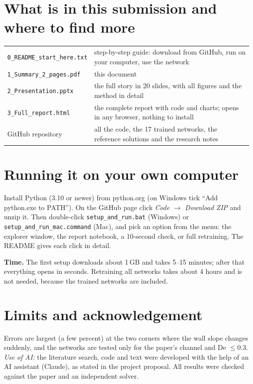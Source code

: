 \documentclass[10.5pt,a4paper]{article}
\newcommand{\code}[1]{\texttt{#1}}
\begin{document}
\section{What is in this submission and where to find more}
\begin{tabularx}{\linewidth}{@{}lX@{}}
\code{0\_README\_start\_here.txt} & step-by-step guide: download from GitHub, run on your computer, use the network\\
\code{1\_Summary\_2\_pages.pdf} & this document\\
\code{2\_Presentation.pptx} & the full story in 20 slides, with all figures and the method in detail\\
\code{3\_Full\_report.html} & the complete report with code and charts; opens in any browser, nothing to install\\
GitHub repository & all the code, the 17 trained networks, the reference solutions and the research notes\\
\end{tabularx}

\section{Running it on your own computer}
Install Python (3.10 or newer) from python.org (on Windows tick ``Add python.exe to PATH''). On the GitHub page click \emph{Code $\rightarrow$ Download ZIP} and unzip it. Then double-click \code{setup\_and\_run.bat} (Windows) or \code{setup\_and\_run\_mac.command} (Mac), and pick an option from the menu: the explorer window, the report notebook, a 10-second check, or full retraining. The README gives each click in detail.

\textbf{Time.} The first setup downloads about 1\,GB and takes 5--15 minutes; after that everything opens in seconds. Retraining all networks takes about 4 hours and is not needed, because the trained networks are included.

\section{Limits and acknowledgement}
Errors are largest (a few percent) at the two corners where the wall slope changes suddenly, and the networks are tested only for the paper's channel and De $\le 0.3$.
\emph{Use of AI:} the literature search, code and text were developed with the help of an AI assistant (Claude), as stated in the project proposal. All results were checked against the paper and an independent solver.
\end{document}
